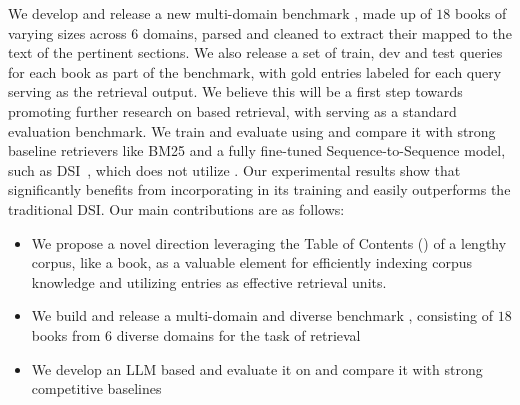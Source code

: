 We develop and release a new multi-domain benchmark {\ben}, made up of $18$ books of varying sizes across $6$ domains, parsed and cleaned to extract their {\toc} mapped to the text of the pertinent sections. We also release a set of train, dev and test queries for each book as part of the benchmark, with gold {\toc} entries labeled for each query serving as the retrieval output. We believe this will be a first step towards promoting further research on {\toc} based retrieval, with {\ben} serving as a standard evaluation benchmark. We train and evaluate {\sys} using {\ben} and compare it with strong baseline retrievers like BM25 and a fully fine-tuned Sequence-to-Sequence model, such as DSI~\cite{Tay2022TransformerMA}, which does not utilize {\toc}. Our experimental results show that {\sys} significantly benefits from incorporating {\toc} in its training and easily outperforms the traditional DSI. Our main contributions are as follows:
\begin{itemize}
\item We propose a novel direction leveraging the Table of Contents ({\toc}) of a lengthy corpus, like a book, as a valuable element for efficiently indexing corpus knowledge and utilizing {\toc} entries as effective retrieval units.
\item We build and release a multi-domain and diverse benchmark {\ben}, consisting of $18$ books from $6$ diverse domains for the task of {\toc} retrieval
\item We develop an LLM based {\sys} and evaluate it on {\ben} and compare it with strong competitive baselines
\end{itemize}